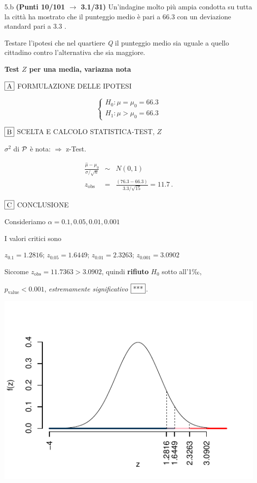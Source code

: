 \documentclass[
  11pt,
]{book}
\theoremstyle{mytheoremstyle}
\theoremstyle{mydefstyle}
\newenvironment{sol}
  {
  \begin{tcolorbox}[enhanced,breakable,arc=0.1mm,boxrule=1pt,colback=white,colframe=iblue,
  title=\bf \fontfamily{lmss}\selectfont \hspace{.5 cm} Soluzione,drop fuzzy shadow]

}{
\end{tcolorbox}
  }
\begin{document}
5.b \textbf{(Punti 10/101 \(\rightarrow\) 3.1/31)} Un'indagine molto più ampia condotta su tutta la città ha mostrato che
il punteggio medio è pari a 66.3 con un deviazione standard pari a 3.3 .

Testare l'ipotesi che nel quartiere \emph{Q} il punteggio medio sia uguale a quello cittadino contro l'alternativa che sia maggiore.

\begin{sol}
\textbf{Test \(Z\) per una media, variazna nota}

\(\fbox{A}\) FORMULAZIONE DELLE IPOTESI

\[\begin{cases}
   H_0: \mu = \mu_0=66.3 \\
   H_1: \mu > \mu_0=66.3 
   \end{cases}\]

\(\fbox{B}\) SCELTA E CALCOLO STATISTICA-TEST, \(Z\)

\(\sigma^{2}\) di \(\cal{P}\) è nota: \(\Rightarrow\) z-Test.

\begin{eqnarray*}
   \frac{\hat\mu - \mu_{0}} {\sigma/\sqrt{n}}&\sim&N(0,1)\\
   z_{\text{obs}}
   &=& \frac{ ( 76.3 -  66.3 )} { 3.3 /\sqrt{ 15 }}
   =   11.7 \, .
   \end{eqnarray*}

\(\fbox{C}\) CONCLUSIONE

Consideriamo \(\alpha=0.1, 0.05, 0.01, 0.001\)

I valori critici sono

\(z_{0.1}=1.2816\); \(z_{0.05}=1.6449\); \(z_{0.01}=2.3263\); \(z_{0.001}=3.0902\)

Siccome \(z_\text{obs}=11.7363>3.0902\), quindi \textbf{rifiuto} \(H_0\) sotto all'1‰,

\(p_\text{value}<0.001\), \emph{estremamente significativo} \(\fbox{***}\).

\begin{center}\includegraphics{Esami_passati_con_soluzioni_files/figure-latex/2022-72-1} \end{center}


\end{sol}
\end{document}
